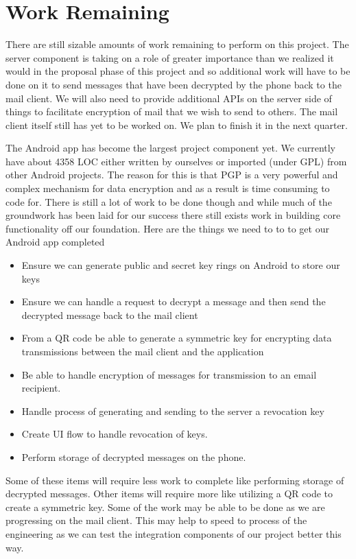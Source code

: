 \documentclass{article}
\begin{document}
\section{Work Remaining}
\par There are still sizable amounts of work remaining to perform on this project. The server component is taking on a role of greater importance than we realized it would in the proposal phase of this project and so additional work will have to be done on it to send messages that have been decrypted by the phone back to the mail client. We will also need to provide additional APIs on the server side of things to facilitate encryption of mail that we wish to send to others. The mail client itself still has yet to be worked on. We plan to finish it in the next quarter.
\par The Android app has become the largest project component yet. We currently have about 4358 LOC either written by ourselves or imported (under GPL) from other Android projects. The reason for this is that PGP is a very powerful and complex mechanism for data encryption and as a result is time consuming to code for. There is still a lot of work to be done though and while much of the groundwork has been laid for our success there still exists work in building core functionality off our foundation. Here are the things we need to to to get our Android app completed
\begin{itemize}
    \item Ensure we can generate public and secret key rings on Android to store our keys
    \item Ensure we can handle a request to decrypt a message and then send the decrypted message back to the mail client
    \item From a QR code be able to generate a symmetric key for encrypting data transmissions between the mail client and the application
    \item Be able to handle encryption of messages for transmission to an email recipient.
    \item Handle process of generating and sending to the server a revocation key
    \item Create UI flow to handle revocation of keys.
    \item Perform storage of decrypted messages on the phone.
\end{itemize}

Some of these items will require less work to complete like performing storage of decrypted messages. Other items will require more like utilizing a QR code to create a symmetric key. Some of the work may be able to be done as we are progressing on the mail client. This may help to speed to process of the engineering as we can test the integration components of our project better this way.
\end{document}
